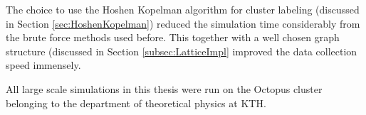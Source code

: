The choice to use the Hoshen Kopelman algorithm for cluster labeling (discussed in Section \ref{sec:HoshenKopelman}) reduced the simulation time considerably from the brute force methods used before. This together with a well chosen graph structure (discussed in Section \ref{subsec:LatticeImpl} improved the data collection speed immensely.

All large scale simulations in this thesis were run on the Octopus cluster belonging to the department of theoretical physics at KTH.



